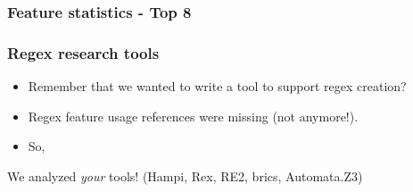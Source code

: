 %

%  
%



\begin{frame}[fragile]
\frametitle{Feature statistics - Top 8}
\begin{center}

\end{center}
\end{frame}



\begin{frame}
\frametitle{Regex research tools}

\begin{itemize}
\item Remember that we wanted to write a tool to support regex creation?
\item<2-> Regex feature usage references were missing (not anymore!).
\item <3-> So, 
\end{itemize}

\begin{block}{}%
\begin{large}We analyzed \emph{your} tools! (Hampi, Rex, RE2, brics, Automata.Z3)\end{large}
\end{block}


\end{frame}


